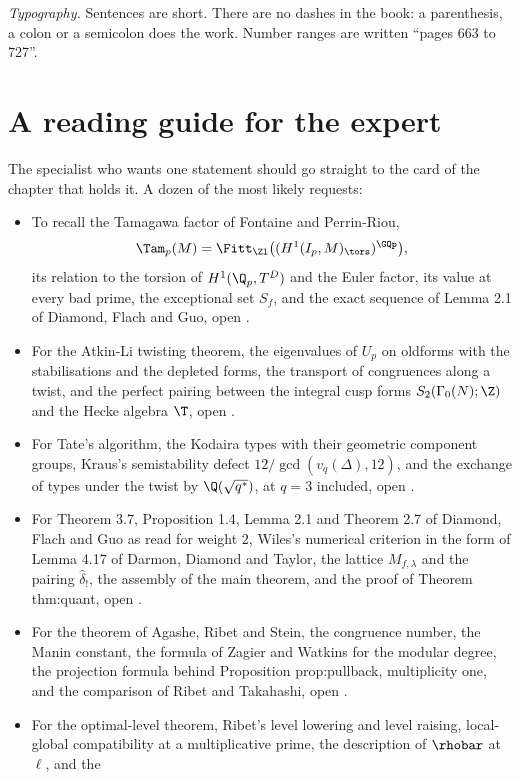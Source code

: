 \emph{Typography.} Sentences are short. There are no dashes in the book: a parenthesis, a colon
or a semicolon does the work. Number ranges are written ``pages 663 to 727''.

\section*{A reading guide for the expert}

The specialist who wants one statement should go straight to the card of the chapter that holds
it. A dozen of the most likely requests:
\begin{itemize}
\item To recall the Tamagawa factor of Fontaine and Perrin-Riou,
\[
\Tam_p(M)=\Fitt_{\Zl}\bigl((H^1(I_p,M)_{\tors})^{\GQp}\bigr),
\]
its relation to the torsion of
$H^1(\Q_p,T^D)$ and the Euler factor, its value at every bad prime, the exceptional set $S_f$,
and the exact sequence of Lemma 2.1 of Diamond, Flach and Guo, open .
\item For the Atkin-Li twisting theorem, the eigenvalues of $U_p$ on oldforms with the
stabilisations and the depleted forms, the transport of congruences along a twist, and the perfect
pairing between the integral cusp forms $S_2(\Gamma_0(N);\Z)$ and the Hecke algebra $\T$, open
.
\item For Tate's algorithm, the Kodaira types with their geometric component groups, Kraus's
semistability defect $12/\gcd(v_q(\Delta),12)$, and the exchange of types under the twist by
$\Q(\sqrt{q^*})$, at $q=3$ included, open .
\item For Theorem 3.7, Proposition 1.4, Lemma 2.1 and Theorem 2.7 of Diamond, Flach and Guo as
read for weight $2$, Wiles's numerical criterion in the form of Lemma 4.17 of Darmon, Diamond and
Taylor, the lattice $M_{f,\lambda}$ and the pairing $\hat\delta_!$, the assembly of the main
theorem, and the proof of Theorem thm:quant, open .
\item For the theorem of Agashe, Ribet and Stein, the congruence number, the Manin constant, the
formula of Zagier and Watkins for the modular degree, the projection formula behind Proposition
prop:pullback, multiplicity one, and the comparison of Ribet and Takahashi, open .
\item For the optimal-level theorem, Ribet's level lowering and level raising, local-global
compatibility at a multiplicative prime, the description of $\rhobar$ at $\ell$, and the

\end{itemize}
